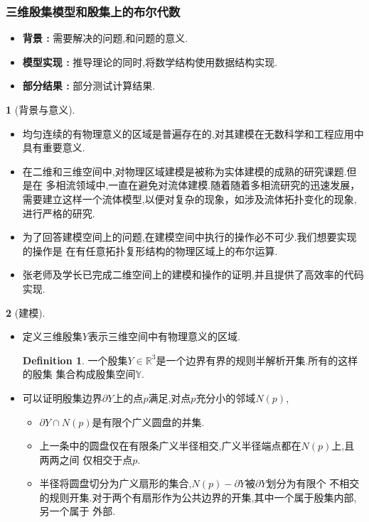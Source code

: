 \documentclass[UTF8]{ctexbeamer}	%
\theoremstyle{plain}
\theoremstyle{definition}
\newtheorem{emt}{}[section]
\newtheorem{defn}{Definition}[section]
\theoremstyle{remark}
\numberwithin{equation}{section}
\begin{document}
\begin{frame}
    \frametitle{三维殷集模型和殷集上的布尔代数}
    \begin{itemize}
        \setlength{\itemsep}{30pt}
        \item \textbf{背景 : } 需要解决的问题,和问题的意义.
        \item \textbf{模型实现 : } 推导理论的同时,将数学结构使用数据结构实现.
        \item  \textbf{部分结果 : } 部分测试计算结果.
    \end{itemize}
\end{frame}

\begin{frame}
    \begin{emt}[背景与意义\cite{2020Boolean}]
        \begin{itemize}
            \item 均匀连续的有物理意义的区域是普遍存在的,对其建模在无数科学和工程应用中具有重要意义.
            \item 在二维和三维空间中,对物理区域建模是被称为实体建模的成熟的研究课题.但是在
            多相流领域中,一直在避免对流体建模.随着随着多相流研究的迅速发展，
            需要建立这样一个流体模型,以便对复杂的现象，如涉及流体拓扑变化的现象,进行严格的研究.
            \item 为了回答建模空间上的问题,在建模空间中执行的操作必不可少.我们想要实现的操作是
            在有任意拓扑复形结构的物理区域上的布尔运算.
            \item 张老师及学长已完成二维空间上的建模和操作的证明,并且提供了高效率的代码实现.
        \end{itemize}
    \end{emt}
\end{frame}

\begin{frame}
    \begin{emt}[建模]
        \begin{itemize}
        \item 定义三维殷集$Y$表示三维空间中有物理意义的区域.
         \begin{defn}
             一个殷集$Y \in \mathbb{R}^3$是一个边界有界的规则半解析开集.所有的这样的殷集
             集合构成殷集空间$\mathbb{Y}$.
         \end{defn}
        \item 可以证明殷集边界$\partial Y$上的点$p$满足,对点$p$充分小的邻域$N(p)$,
        \begin{itemize}
            \item $\partial Y \cap N(p)$是有限个广义圆盘的并集.
            \item 上一条中的圆盘仅在有限条广义半径相交,广义半径端点都在$N(p)$上,且两两之间
            仅相交于点$p$.
            \item 半径将圆盘切分为广义扇形的集合,$N(p) - \partial Y$被$\partial Y$划分为有限个
            不相交的规则开集.对于两个有扇形作为公共边界的开集,其中一个属于殷集内部,另一个属于
            外部.
        \end{itemize}
        \end{itemize}
    \end{emt}
\end{frame}
\end{document}
